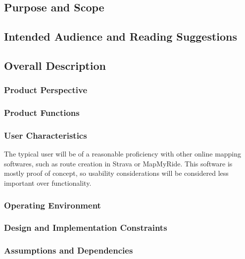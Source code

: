 \documentclass[11pt,a4paper]{report}
\begin{document}
\subsection{Purpose and Scope}

\subsection{Intended Audience and Reading Suggestions}

\subsection{Overall Description}
\subsubsection{Product Perspective}

\subsubsection{Product Functions}

\subsubsection{User Characteristics}
The typical user will be of a reasonable proficiency with other online mapping softwares, such as route
creation in Strava or MapMyRide. This software is mostly proof of concept, so usability considerations will
be considered less important over functionality.

\subsubsection{Operating Environment}

\subsubsection{Design and Implementation Constraints}

\subsubsection{Assumptions and Dependencies}
\end{document}
